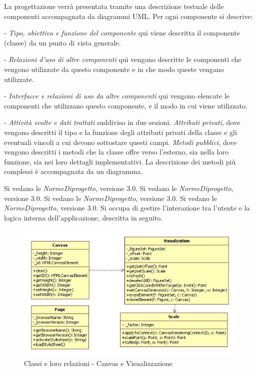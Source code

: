 La progettazione verr\`a presentata tramite una descrizione testuale delle componenti accompagnata da diagrammi UML. Per ogni componente si descrive:
\begin{elencopuntato}[\subsecindent]
\item[-] \textit{Tipo, obiettivo e funzione del componente} qui viene descritta il componente (classe) da un punto di vista generale.
\item[-] \textit{Relazioni d'uso di altre componenti} qui vengono descritte le componenti che vengono utilizzate da questo componente e in che modo queste vengano utilizzate.
\item[-] \textit{Interfacce e relazioni di uso da altre componenti} qui vengono elencate le componenti che utilizzano questo componente, e il modo in cui viene utilizzato.
\item[-] \textit{Attivit\`a svolte e dati trattati} suddiviso in due sezioni. \textit{Attributi privati}, dove vengono descritti il tipo e la funzione degli attributi privati della classe e gli eventuali vincoli a cui devono sottostare questi campi. \textit{Metodi pubblici}, dove vengono descritti i metodi che la classe offre verso l'esterno, sia nella loro funzione, sia nei loro dettagli implementativi. La descrizione dei metodi pi\`u complessi \`e accompagnata da un diagramma.
\end{elencopuntato}

Si vedano le \textit{NormeDiprogetto}, versione 3.0.
Si vedano le \textit{NormeDiprogetto}, versione 3.0.
Si vedano le \textit{NormeDiprogetto}, versione 3.0.
Si vedano le \textit{NormeDiprogetto}, versione 3.0.
\newpage
{}
Si occupa di gestire l'interazione tra l'utente e la logica interna dell'applicazione, descritta in seguito.

\begin{figure}[!ht]
\centering
\includegraphics[scale=0.7]{visual.jpg}
\caption{Classi e loro relazioni - Canvas e Visualizzazione}
\end{figure}


